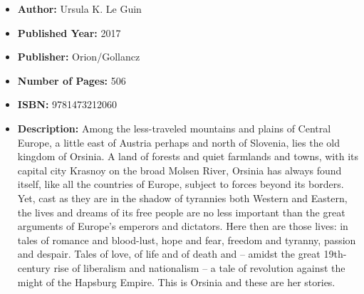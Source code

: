 \documentclass{tufte-handout}
\begin{document}
\begin{itemize}
    \item[] \textbf{Author:} Ursula K. Le Guin
    \item[] \textbf{Published Year:} 2017
    \item[] \textbf{Publisher:} Orion/Gollancz
    \item[] \textbf{Number of Pages:} 506      
    \item[] \textbf{ISBN:} 9781473212060
    \item[] \textbf{Description:} Among the less-traveled mountains and plains of Central Europe, a little east of Austria perhaps and north of Slovenia, lies the old kingdom of Orsinia. A land of forests and quiet farmlands and towns, with its capital city Krasnoy on the broad Molsen River, Orsinia has always found itself, like all the countries of Europe, subject to forces beyond its borders. Yet, cast as they are in the shadow of tyrannies both Western and Eastern, the lives and dreams of its free people are no less important than the great arguments of Europe’s emperors and dictators. Here then are those lives: in tales of romance and blood-lust, hope and fear, freedom and tyranny, passion and despair. Tales of love, of life and of death and – amidst the great 19th-century rise of liberalism and nationalism – a tale of revolution against the might of the Hapsburg Empire. This is Orsinia and these are her stories.
\end{itemize}
\end{document}
